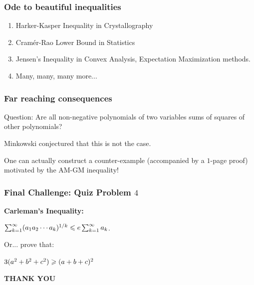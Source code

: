 \documentclass{beamer}
\begin{document}
\begin{frame}
\frametitle{Ode to beautiful inequalities}
\begin{enumerate}
\item Harker-Kasper Inequality in Crystallography
\pause
\item Cram\'{e}r-Rao Lower Bound in Statistics
\pause
\item Jensen's Inequality in Convex Analysis, Expectation Maximization methods.
\pause
\item Many, many, many more...
\end{enumerate}
\end{frame}

\begin{frame}
\frametitle{Far reaching consequences}
Question: Are all non-negative polynomials of two variables sums of squares of other polynomials?
\vspace*{0.2in}

Minkowski conjectured that this is {\color{red} not} the case. 

One can actually construct a counter-example (accompanied by a $1$-page proof) motivated by the AM-GM
inequality!
\end{frame}

\begin{frame}
\frametitle{Final Challenge: Quiz Problem $4$}
\bf{Carleman's Inequality}:
\begin{center}
$\sum_{k=1}^{\infty} (a_1 a_2 \cdots a_k)^{1/k} \leqslant e \sum_{k=1}^{\infty} a_k$.
\end{center}
\pause
Or... \pause prove that:
\begin{center}
$3(a^2 + b^2 + c^2) \geqslant (a + b + c)^2$
\end{center}
\end{frame}

\begin{frame}
\begin{center}
{\bf THANK YOU}
\end{center}
\end{frame}
\end{document}
